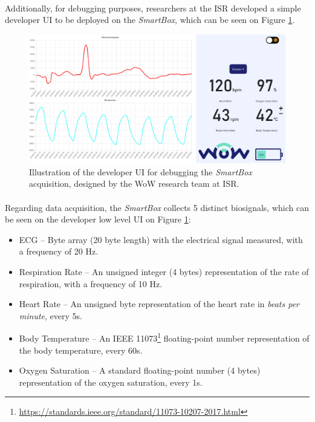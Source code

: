 \paragraph{} Additionally, for debugging purposes, researchers at the \acs{ISR} developed a simple developer \acs{UI} to be deployed on the \textit{SmartBox}, which can be seen on Figure \ref{fig:smartbox-gui}.

\begin{figure}[H]
    \centering
    \includegraphics[width=\linewidth]{images/smartbox-gui.png}
    \caption{Illustration of the developer \acs{UI} for debugging the \textit{SmartBox} acquisition, designed by the \acs{WoW} research team at \acs{ISR}.}
    \label{fig:smartbox-gui}
\end{figure}

\paragraph{} Regarding data acquisition, the \textit{SmartBox} collects 5 distinct biosignals, which can be seen on the developer low level \acs{UI} on Figure \ref{fig:smartbox-gui}:

\label{sec:biosticker_data}

\begin{itemize}
    \item \acf{ECG} -- Byte array (20 byte length) with the electrical signal measured, with a frequency of 20 Hz.
    \item Respiration Rate -- An unsigned integer (4 bytes) representation of the rate of respiration, with a frequency of 10 Hz.
    \item Heart Rate -- An unsigned byte representation of the heart rate in \textit{beats per minute}, every 5s.
    \item Body Temperature -- An IEEE 11073\footnote{\url{https://standards.ieee.org/standard/11073-10207-2017.html}} floating-point number representation of the body temperature, every 60s.
    \item Oxygen Saturation -- A standard floating-point number (4 bytes) representation of the oxygen saturation, every 1s.
\end{itemize}

